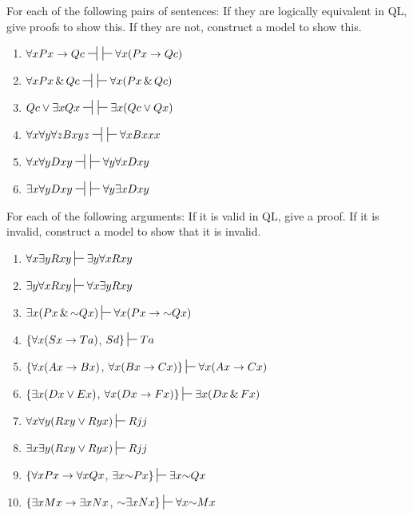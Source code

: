 \problempart
\label{pr.QLequivornot}
For each of the following pairs of sentences: If they are logically equivalent in QL, give proofs to show this. If they are not, construct a model to show this.
\begin{enumerate}[label=\arabic*), topsep=0pt, parsep=0pt, itemsep=3pt]
\item $\forall x Px \eif Qc \nsststile{}{} \hspace{.5em} \sststile{}{}\forall x (Px \eif Qc)$
\item $\forall x Px \eand Qc\nsststile{}{} \hspace{.5em} \sststile{}{}\forall x (Px \eand Qc)$
\item $Qc \eor \exists x Qx\nsststile{}{} \hspace{.5em} \sststile{}{}\exists x (Qc \eor Qx)$
\item $\forall x\forall y \forall z Bxyz\nsststile{}{} \hspace{.5em} \sststile{}{}\forall x Bxxx$
\item $\forall x\forall y Dxy\nsststile{}{} \hspace{.5em} \sststile{}{}\forall y\forall x Dxy$
\item $\exists x\forall y Dxy\nsststile{}{} \hspace{.5em} \sststile{}{}\forall y\exists x Dxy$
\end{enumerate}

\problempart
\label{pr.QLvalidornot}
For each of the following arguments: If it is valid in QL, give a proof. If it is invalid, construct a model to show that it is invalid.
\begin{enumerate}[label=\arabic*), topsep=0pt, parsep=0pt, itemsep=3pt]
\item $\forall x\exists y Rxy \sststile{}{} \exists y\forall x Rxy$
\item $\exists y\forall x Rxy \sststile{}{} \forall x\exists y Rxy$
\item $\exists x(Px \eand \enot Qx) \sststile{}{} \forall x(Px \eif \enot Qx)$
\item $\{\forall x(Sx \rightarrow Ta)$, $Sd\} \sststile{}{}Ta$
\item $\{\forall x(Ax\rightarrow Bx)$, $\forall x(Bx \eif Cx)\} \sststile{}{} \forall x(Ax \eif Cx)$
\item $\{\exists x(Dx \vee Ex)$, $\forall x(Dx \eif Fx)\} \sststile{}{} \exists x(Dx \eand Fx)$
\item $\forall x\forall y(Rxy \eor Ryx)\sststile{}{} Rjj$
\item $\exists x\exists y(Rxy \eor Ryx)\sststile{}{}Rjj$
\item $\{\forall x Px \rightarrow \forall x Qx$, $\exists x \enot Px\}\sststile{}{}\exists x \enot Qx$
\item $\{\exists x Mx \rightarrow \exists x Nx$, $\enot \exists x Nx\}\sststile{}{} \forall x \enot Mx$
\end{enumerate}


